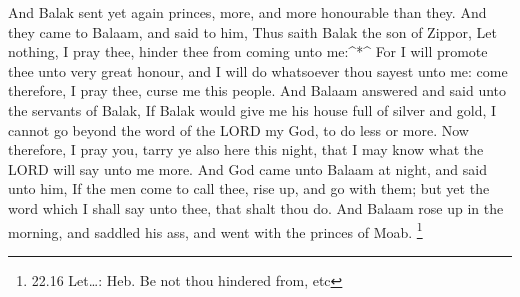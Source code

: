  And Balak sent yet again princes, more, and more
honourable than they.  And they came to Balaam, and said to
him, Thus saith Balak the son of Zippor, Let nothing, I pray thee,
hinder thee from coming unto me:\^{}*\^{}  For I will
promote thee unto very great honour, and I will do whatsoever thou
sayest unto me: come therefore, I pray thee, curse me this people.
 And Balaam answered and said unto the servants of Balak,
If Balak would give me his house full of silver and gold, I cannot go
beyond the word of the LORD my God, to do less or more. 
Now therefore, I pray you, tarry ye also here this night, that I may
know what the LORD will say unto me more.  And God came
unto Balaam at night, and said unto him, If the men come to call thee,
rise up, and go with them; but yet the word which I shall say unto thee,
that shalt thou do.  And Balaam rose up in the morning, and
saddled his ass, and went with the princes of Moab. \footnote{22.16
  Let\ldots: Heb. Be not thou hindered from, etc}

